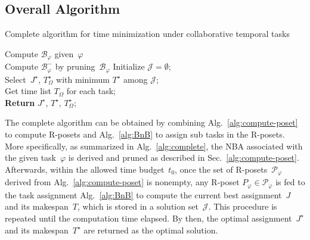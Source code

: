 \subsection{Overall Algorithm}\label{subsubsec:overall-algorithm}

\begin{algorithm}[t]
	\caption{Complete algorithm for time minimization
        under collaborative temporal tasks}
	\label{alg:complete}
	Compute $\mathcal{B}_{\varphi}$ given~$\varphi$ \\
	Compute $\mathcal{B}^{-}_{\varphi}$ by pruning~$\mathcal{B}_{\varphi}$
        Initialize $\mathcal{J}=\emptyset$;\\
        Select~$J^\star$, $T^\star_\Omega$ with minimum $T^\star$ among $\mathcal{J}$;\\
        Get time list $T_\Omega$ for each task;\\
	\textbf{Return} $J^\star$, $T^\star$, $T^\star_\Omega$;
\end{algorithm}

The complete algorithm can be obtained by combining
Alg.~\ref{alg:compute-poset} to compute R-posets
and Alg.~\ref{alg:BnB} to assign sub tasks in the R-posets.
More specifically, as summarized in Alg.~\ref{alg:complete},
the NBA associated with the given task~$\varphi$ is derived and pruned as
described in Sec.~\ref{alg:compute-poset}.
Afterwards, within the allowed time budget~$t_0$,
once the set of R-posets~$\mathcal{P}_{\varphi}$ derived from
Alg.~\ref{alg:compute-poset}
is nonempty, any R-poset $P_\varphi\in \mathcal{P}_{\varphi}$ is fed to
the task assignment Alg.~\ref{alg:BnB} to compute the current best
assignment~$J$ and its makespan~$T$, which is stored in
a solution set~$\mathcal{J}$.
This procedure is repeated until the computation time elapsed.
By then, the optimal assignment~$J^\star$ and its makespan~$T^\star$
are returned as the optimal solution.

